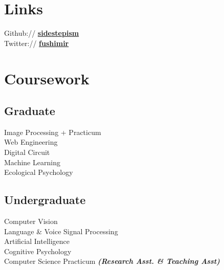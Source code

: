\documentclass[letterpaper]{deedy-resume} %
\begin{document}
\begin{minipage}[t]{0.33\textwidth}

\section{Links} 

Github:// \href{https://github.com/sidestepism}{\bf sidestepism} \\
Twitter:// \href{https://twitter.com/fushimir}{\bf fushimir} \\

\sectionspace %


\section{Coursework}

\subsection{Graduate}

Image Processing + Practicum \\ 
Web Engineering \\ 
Digital Circuit \\
Machine Learning \\ 
Ecological Psychology

\sectionspace %


\subsection{Undergraduate}

Computer Vision \\
Language \& Voice Signal Processing \\
Artificial Intelligence \\
Cognitive Psychology \\
Computer Science Practicum 
{\footnotesize \textit{\textbf{(Research Asst. \& Teaching Asst) }}} \\


\end{minipage}
\end{document}
